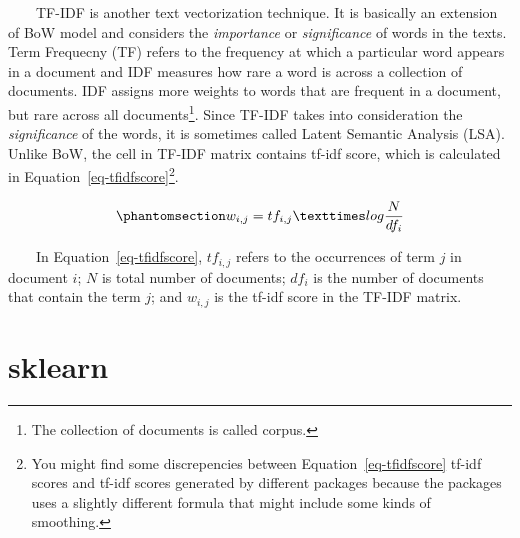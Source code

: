\documentclass[
  letterpaper,
  DIV=11,
  numbers=noendperiod]{scrreprt}
\begin{document}
~~~~TF-IDF is another text vectorization technique. It is basically an
extension of BoW model and considers the \emph{importance} or
\emph{significance} of words in the texts. Term Frequecny (TF) refers to
the frequency at which a particular word appears in a document and IDF
measures how rare a word is across a collection of documents. IDF
assigns more weights to words that are frequent in a document, but rare
across all documents\footnote{The collection of documents is called
  corpus.}. Since TF-IDF takes into consideration the
\emph{significance} of the words, it is sometimes called Latent Semantic
Analysis (LSA). Unlike BoW, the cell in TF-IDF matrix contains tf-idf
score, which is calculated in Equation~\ref{eq-tfidfscore}\footnote{You
  might find some discrepencies between Equation~\ref{eq-tfidfscore}
  tf-idf scores and tf-idf scores generated by different packages
  because the packages uses a slightly different formula that might
  include some kinds of smoothing.}.

\begin{equation}\protect\phantomsection\label{eq-tfidfscore}{
w_{i,j} = tf_{i,j} × log\frac{N}{df_{i}} 
}\end{equation}

~~~~In Equation~\ref{eq-tfidfscore}, \(tf_{i,j}\) refers to the
occurrences of term \(j\) in document \(i\); \(N\) is total number of
documents; \(df_{i}\) is the number of documents that contain the term
\(j\); and \(w_{i,j}\) is the tf-idf score in the TF-IDF matrix.

\section{sklearn}
\end{document}
